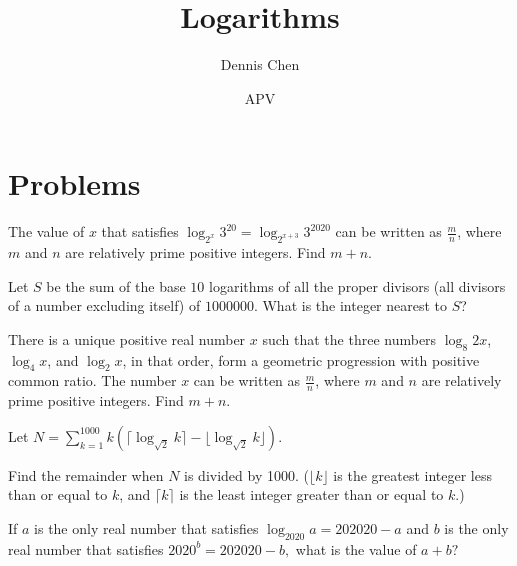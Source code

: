 \documentclass{article}
\title{Logarithms}
\author{Dennis Chen}
\date{APV}
\begin{document}
\maketitle



\pagebreak

\section{Problems}


\begin{prob}[AIME II 2020/3]{1}
The value of $x$ that satisfies $\log_{2^x} 3^{20} = \log_{2^{x+3}} 3^{2020}$ can be written as $\frac{m}{n}$, where $m$ and $n$ are relatively prime positive integers. Find $m+n$.
\end{prob}

\begin{prob}[AIME 1986/8]{2}
Let $S$ be the sum of the base $10$ logarithms of all the proper divisors (all divisors of a number excluding itself) of $1000000$. What is the integer nearest to $S$?
\end{prob}

\begin{prob}[AIME I 2020/2]{2}
There is a unique positive real number $x$ such that the three numbers $\log_8{2x}$, $\log_4{x}$, and $\log_2{x}$, in that order, form a geometric progression with positive common ratio. The number $x$ can be written as $\frac{m}{n}$, where $m$ and $n$ are relatively prime positive integers. Find $m + n$.
\end{prob}

\begin{prob}[AIME I 2007/7]{2}
Let $N = \sum\limits_{k = 1}^{1000} k ( \lceil \log_{\sqrt{2}} k \rceil  - \lfloor \log_{\sqrt{2}} k \rfloor ).$

Find the remainder when $N$ is divided by 1000. ($\lfloor{k}\rfloor$ is the greatest integer less than or equal to $k$, and $\lceil{k}\rceil$ is the least integer greater than or equal to $k$.)
\end{prob}

\begin{prob}[SMT 2020]{3}
If $a$ is the only real number that satisfies $\log_{2020}a=202020-a$ and $b$ is the only real number that satisfies $2020^b=202020-b,$ what is the value of $a+b?$
\end{prob}
\end{document}
